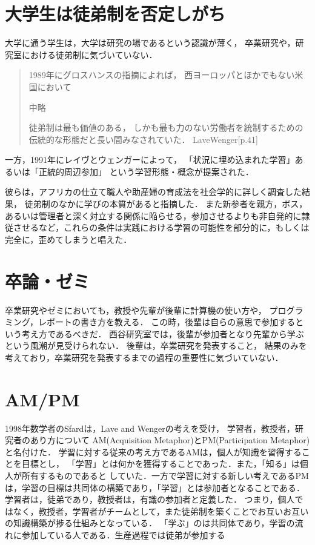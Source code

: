 \documentclass{jsarticle}
\begin{document}
\section{大学生は徒弟制を否定しがち}
\label{sec:org8f2bcb9}
大学に通う学生は，大学は研究の場であるという認識が薄く，
卒業研究や，研究室における徒弟制に気づいていない．

\begin{quote}
1989年にグロスハンスの指摘によれば，
西ヨーロッパとほかでもない米国において

中略

徒弟制は最も価値のある，
しかも最も力のない労働者を統制するための伝統的な形態だと長い間みなされていた．
LaveWenger[p.41]
\end{quote}
一方，1991年にレイヴとウェンガーによって，
「状況に埋め込まれた学習」あるいは「正統的周辺参加」
という学習形態・概念が提案された．

彼らは，アフリカの仕立て職人や助産婦の育成法を社会学的に詳しく調査した結果，
徒弟制のなかに学びの本質があると指摘した．
また新参者を親方，ボス，あるいは管理者と深く対立する関係に陥らせる，参加させるよりも非自発的に隷従させるなど，これらの条件は実践における学習の可能性を部分的に，もしくは完全に，歪めてしまうと唱えた．

\section{卒論・ゼミ}
\label{sec:org358da81}
卒業研究やゼミにおいても，教授や先輩が後輩に計算機の使い方や，
プログラミング，レポートの書き方を教える．
この時，後輩は自らの意思で参加するという考え方であるべきだ．
西谷研究室では，後輩が参加者となり先輩から学ぶという風潮が見受けられない．
後輩は，卒業研究を発表すること，
結果のみを考えており，卒業研究を発表するまでの過程の重要性に気づいていない．

\section{AM/PM}
\label{sec:orgb6cb26c}
1998年数学者のSfardは，Lave and Wengerの考えを受け，
学習者，教授者，研究者のあり方について
AM(Acquisition Metaphor)とPM(Participation Metaphor)と名付けた．
学習に対する従来の考え方であるAMは，個人が知識を習得することを目標とし，
「学習」とは何かを獲得することであった．また，「知る」は個人が所有するものであると
していた．一方で学習に対する新しい考えであるPMは，学習の目標は共同体の構築であり，「学習」とは参加者となることである．学習者は，徒弟であり，教授者は，有識の参加者と定義した．
つまり，個人ではなく，教授者，学習者がチームとして，また徒弟制を築くことでお互いお互いの知識構築が捗る仕組みとなっている．
「学ぶ」のは共同体であり，学習の流れに参加している人である．生産過程では徒弟が参加する
\end{document}
